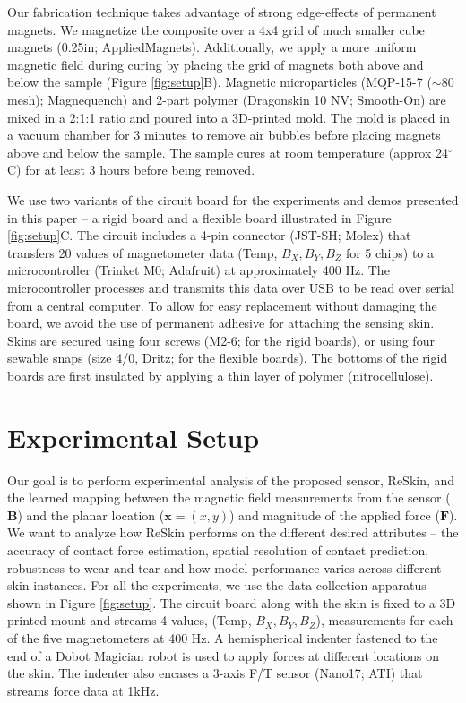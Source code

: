 \documentclass{article}
\let\vec\mathbf
\begin{document}
 Our fabrication technique takes advantage of strong edge-effects of permanent magnets. We magnetize the composite over a 4x4 grid of much smaller cube magnets (0.25in; AppliedMagnets). Additionally, we apply a more uniform magnetic field during curing by placing the grid of magnets both above and below the sample (Figure \ref{fig:setup}B). Magnetic microparticles (MQP-15-7 ($\sim$80 mesh); Magnequench) and 2-part polymer (Dragonskin 10 NV; Smooth-On) are mixed in a 2:1:1 ratio and poured into a 3D-printed mold. The mold is placed in a vacuum chamber for 3 minutes to remove air bubbles before placing magnets above and below the sample. The sample cures at room temperature (approx 24$^\circ$C) for at least 3 hours before being removed.

 We use two variants of the circuit board for the experiments and demos presented in this paper -- a rigid board and a flexible board illustrated in Figure \ref{fig:setup}C. The circuit includes a 4-pin connector (JST-SH; Molex) that transfers 20 values of magnetometer data (Temp, $B_X, B_Y, B_Z$ for 5 chips) to a microcontroller (Trinket M0; Adafruit) at approximately 400 Hz. The microcontroller processes and transmits this data over USB to be read over serial from a central computer. To allow for easy replacement without damaging the board, we avoid the use of permanent adhesive for attaching the sensing skin. Skins are secured using four screws (M2-6; for the rigid boards), or using four sewable snaps (size 4/0, Dritz; for the flexible boards). The bottoms of the rigid boards are first insulated by applying a thin layer of polymer (nitrocellulose). 


\vspace{-0.05in}
\section{Experimental Setup}
\vspace{-0.1in}
\label{sec:expt_setup}
Our goal is to perform experimental analysis of the proposed sensor, ReSkin, and the learned mapping between the magnetic field measurements from the sensor ($\vec{B}$) and the planar location ($\vec{x} = (x,y)$) and magnitude of the applied force ($\vec{F}$). We want to analyze how ReSkin performs on the different desired attributes -- the accuracy of contact force estimation, spatial resolution of contact prediction, robustness to wear and tear and how model performance varies across different skin instances. For all the experiments, we use the data collection apparatus shown in Figure \ref{fig:setup}.  The circuit board along with the skin is fixed to a 3D printed mount and streams 4 values, (Temp, $B_X, B_Y, B_Z$), measurements for each of the five magnetometers at 400 Hz. A hemispherical indenter fastened to the end of a Dobot Magician robot is used to apply forces at different locations on the skin. The indenter also encases a 3-axis F/T sensor (Nano17; ATI) that streams force data at 1kHz. 
\end{document}
